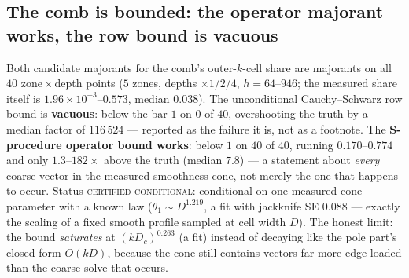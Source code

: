 \documentclass[11pt,a4paper]{article}
\begin{document}
\subsection{The comb is bounded: the operator majorant works, the row bound is vacuous}
Both candidate majorants for the comb's outer-$k$-cell share are majorants on all $40$
zone\,$\times$\,depth points ($5$ zones, depths $\times1/2/4$, $h=64$--$946$; the measured
share itself is $1.96\times10^{-3}$--$0.573$, median $0.038$). The unconditional
Cauchy--Schwarz row bound is \textbf{vacuous}: below the bar $1$ on $0$ of $40$, overshooting
the truth by a median factor of $116\,524$ --- reported as the failure it is, not as a
footnote. The \textbf{S-procedure operator bound works}: below $1$ on $40$ of $40$, running
$0.170$--$0.774$ and only $1.3$--$182\times$ above the truth (median $7.8$) --- a statement
about \emph{every} coarse vector in the measured smoothness cone, not merely the one that
happens to occur. Status \textsc{certified-conditional}: conditional on one measured cone
parameter with a known law ($\theta_1\sim D^{1.219}$, a fit with jackknife SE $0.088$ ---
exactly the scaling of a fixed smooth profile sampled at cell width $D$). The honest limit:
the bound \emph{saturates} at $(kD_c)^{0.263}$ (a fit) instead of decaying like the pole
part's closed-form $O(kD)$, because the cone still contains vectors far more edge-loaded than
the coarse solve that occurs.
\end{document}
